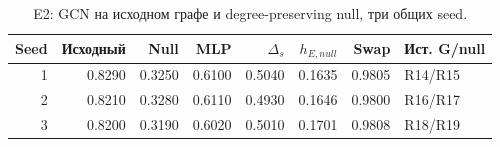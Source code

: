 \begin{table}[H]\centering\footnotesize
\setlength{\tabcolsep}{4pt}
\caption{E2: GCN на исходном графе и degree-preserving null, три общих seed.}\label{tab:paired}
\begin{tabular}{rrrrrrrl}
\toprule
Seed & Исходный & Null & MLP & $\Delta_s$ & $h_{E,null}$ & Swap & Ист. G/null \\
\midrule
1 & 0.8290 & 0.3250 & 0.6100 & 0.5040 & 0.1635 & 0.9805 & R14/R15 \\
2 & 0.8210 & 0.3280 & 0.6110 & 0.4930 & 0.1646 & 0.9800 & R16/R17 \\
3 & 0.8200 & 0.3190 & 0.6020 & 0.5010 & 0.1701 & 0.9808 & R18/R19 \\
\bottomrule
\end{tabular}
\end{table}
